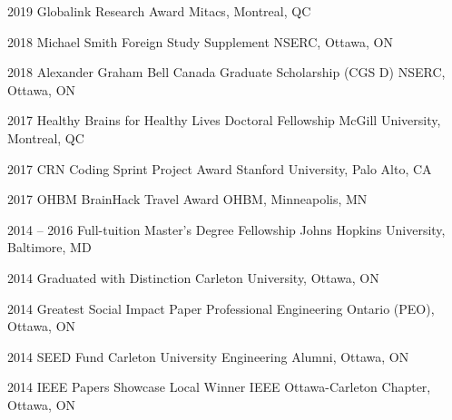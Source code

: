 \documentclass[]{friggeri-cv} %
\begin{document}
\begin{entrylist}
\vspace{-7pt}

\entry
{2019}
{Globalink Research Award}
{Mitacs, Montreal, QC}
{}
\vspace{-7pt}

\entry
{2018}
{Michael Smith Foreign Study Supplement}
{NSERC, Ottawa, ON}
{}
\vspace{-7pt}

\entry
{2018}
{Alexander Graham Bell Canada Graduate Scholarship (CGS D)}
{NSERC, Ottawa, ON}
{}
\vspace{-7pt}


\entry
{2017}
{Healthy Brains for Healthy Lives Doctoral Fellowship}
{McGill University, Montreal, QC}
{}
\vspace{-7pt}

\entry
{2017}
{CRN Coding Sprint Project Award}
{Stanford University, Palo Alto, CA}
{}
\vspace{-7pt}

\entry
{2017}
{OHBM BrainHack Travel Award}
{OHBM, Minneapolis, MN}
{}
\vspace{-7pt}

\entry
{2014 -- 2016}
{Full-tuition Master's Degree Fellowship}
{Johns Hopkins University, Baltimore, MD}
{}
\vspace{-7pt}

\entry
{2014}
{Graduated with Distinction}
{Carleton University, Ottawa, ON}
{}
\vspace{-7pt}

\entry
{2014}
{Greatest Social Impact Paper}
{Professional Engineering Ontario (PEO), Ottawa, ON}
{}
\vspace{-7pt}

\entry
{2014}
{SEED Fund}
{Carleton University Engineering Alumni, Ottawa, ON}
{}
\vspace{-7pt}

\entry
{2014}
{IEEE Papers Showcase Local Winner}
{IEEE Ottawa-Carleton Chapter, Ottawa, ON}
{}
\vspace{-7pt}


\end{entrylist}
\end{document}
